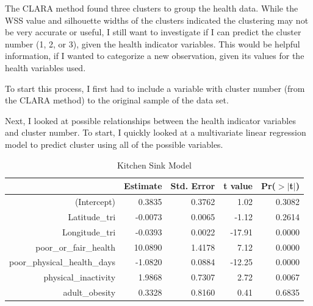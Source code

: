 \documentclass[12pt,twoside]{amherstthesis}
\begin{document}
  The CLARA method found three clusters to group the health data. While
  the WSS value and silhouette widths of the clusters indicated the
  clustering may not be very accurate or useful, I still want to
  investigate if I can predict the cluster number (1, 2, or 3), given the
  health indicator variables. This would be helpful information, if I
  wanted to categorize a new observation, given its values for the health
  variables used.
  
  To start this process, I first had to include a variable with cluster
  number (from the CLARA method) to the original sample of the data set.
  
  \begin{Shaded}
  \begin{Highlighting}[]
  \StringTok{ }\OperatorTok{$}
  \StringTok{ }
  \end{Highlighting}
  \end{Shaded}
  
  Next, I looked at possible relationships between the health indicator
  variables and cluster number. To start, I quickly looked at a
  multivariate linear regression model to predict cluster using all of the
  possible variables.
  
  \begin{Shaded}
  \begin{Highlighting}[]
  \StringTok{ }\OperatorTok{~}
  \end{Highlighting}
  \end{Shaded}
  
  \begin{table}[ht]
  \centering
  \begin{tabular}{rrrrr}
    \hline
   & Estimate & Std. Error & t value & Pr($>$$|$t$|$) \\ 
    \hline
  (Intercept) & 0.3835 & 0.3762 & 1.02 & 0.3082 \\ 
    Latitude\_tri & -0.0073 & 0.0065 & -1.12 & 0.2614 \\ 
    Longitude\_tri & -0.0393 & 0.0022 & -17.91 & 0.0000 \\ 
    poor\_or\_fair\_health & 10.0890 & 1.4178 & 7.12 & 0.0000 \\ 
    poor\_physical\_health\_days & -1.0820 & 0.0884 & -12.25 & 0.0000 \\ 
    physical\_inactivity & 1.9868 & 0.7307 & 2.72 & 0.0067 \\ 
    adult\_obesity & 0.3328 & 0.8160 & 0.41 & 0.6835 \\ 
     \hline
  \end{tabular}
  \caption{Kitchen Sink Model} 
  \end{table}
  
\end{document}
